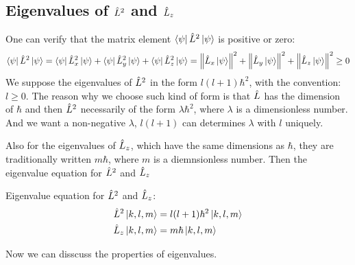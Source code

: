 \subsection{\texorpdfstring{Eigenvalues of $\hat{L}^2$ and $\hat{L}_z$}{Eigenvalues of L² and Lz}}

One can verify that the matrix element $\bra{\psi}\hat{L}^2 \ket{\psi}$ is positive or zero: 
\begin{align}
    \bra{\psi}\hat{L}^2 \ket{\psi} = \bra{\psi}\hat{L}_x^2 \ket{\psi} + \bra{\psi}\hat{L}_y^2 \ket{\psi}+\bra{\psi}\hat{L}_z^2 \ket{\psi} =\left\lVert \hat{L}_x \ket{\psi} \right\rVert^2 + \left\lVert \hat{L}_y \ket{\psi} \right\rVert^2 + \left\lVert \hat{L}_z \ket{\psi} \right\rVert^2 \geq 0
\end{align}
We suppose the eigenvalues of $\hat{L}^2$ in the form $l(l+1)\hbar^2$, with the convention: $l\geq0$. The reason why we choose such kind of form is that $\hat{L}$ has the dimension of $\hbar$ and then $\hat{L}^2$ necessarily of the form $\lambda \hbar^2$, where $\lambda$ is a dimensionless number. And we want a non-negative $\lambda$, $l(l+1)$ can determines $\lambda$ with $l$ uniquely.

Also for the eigenvalues of $\hat{L}_z$, which have the same dimensions as $\hbar$, they are traditionally written $m \hbar$, where $m$ is a diemnsionless number. Then the eigenvalue equation for $\hat{L}^2$ and $\hat{L}_z$
\begin{tcolorbox}{Eigenvalue equation for $\hat{L}^2$ and $\hat{L}_z$:}
    \begin{align}
        \hat{L}^2 \ket{k,l,m} &= l(l+1)\hbar^2 \ket{k,l,m}\\
        \hat{L}_z \ket{k,l,m}& = m \hbar \ket{k,l,m}
    \end{align}
\end{tcolorbox}
Now we can disscuss the properties of eigenvalues.

